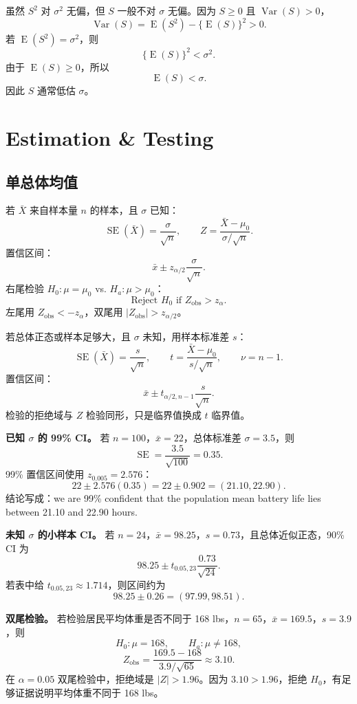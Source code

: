 \documentclass[11pt,a4paper]{article}
\newcommand{\E}{\operatorname{E}}
\newcommand{\Var}{\operatorname{Var}}
\newcommand{\SE}{\operatorname{SE}}
\begin{document}
\begin{proofbox}[为什么样本标准差不是无偏估计]
虽然 $S^2$ 对 $\sigma^2$ 无偏，但 $S$ 一般不对 $\sigma$ 无偏。因为 $S\ge 0$ 且 $\Var(S)>0$，
\[
  \Var(S)=\E(S^2)-\{\E(S)\}^2>0.
\]
若 $\E(S^2)=\sigma^2$，则
\[
  \{\E(S)\}^2<\sigma^2.
\]
由于 $\E(S)\ge 0$，所以
\[
  \E(S)<\sigma.
\]
因此 $S$ 通常低估 $\sigma$。
\end{proofbox}

\section{Estimation \& Testing}

\subsection{单总体均值}

\begin{templatebox}[已知总体标准差的均值推断]
若 $\bar X$ 来自样本量 $n$ 的样本，且 $\sigma$ 已知：
\[
  \SE(\bar X)=\frac{\sigma}{\sqrt n},
  \qquad
  Z=\frac{\bar X-\mu_0}{\sigma/\sqrt n}.
\]
置信区间：
\[
  \boxed{
  \bar x\pm z_{\alpha/2}\frac{\sigma}{\sqrt n}
  }.
\]
右尾检验 $H_0:\mu=\mu_0$ vs. $H_a:\mu>\mu_0$：
\[
  \text{Reject }H_0\text{ if }Z_{\mathrm{obs}}>z_\alpha.
\]
左尾用 $Z_{\mathrm{obs}}<-z_\alpha$，双尾用 $|Z_{\mathrm{obs}}|>z_{\alpha/2}$。
\end{templatebox}

\begin{templatebox}[未知总体标准差的均值推断]
若总体正态或样本足够大，且 $\sigma$ 未知，用样本标准差 $s$：
\[
  \SE(\bar X)=\frac{s}{\sqrt n},
  \qquad
  t=\frac{\bar X-\mu_0}{s/\sqrt n},
  \qquad
  \nu=n-1.
\]
置信区间：
\[
  \boxed{
  \bar x\pm t_{\alpha/2,n-1}\frac{s}{\sqrt n}
  }.
\]
检验的拒绝域与 $Z$ 检验同形，只是临界值换成 $t$ 临界值。
\end{templatebox}

\begin{examplebox}
\textbf{已知 $\sigma$ 的 99\% CI。}
若 $n=100$，$\bar x=22$，总体标准差 $\sigma=3.5$，则
\[
  \SE=\frac{3.5}{\sqrt{100}}=0.35.
\]
99\% 置信区间使用 $z_{0.005}=2.576$：
\[
  22\pm 2.576(0.35)
  =
  22\pm0.902
  =
  (21.10,22.90).
\]
结论写成：we are 99\% confident that the population mean battery life lies between 21.10 and 22.90 hours.

\textbf{未知 $\sigma$ 的小样本 CI。}
若 $n=24$，$\bar x=98.25$，$s=0.73$，且总体近似正态，90\% CI 为
\[
  98.25\pm t_{0.05,23}\frac{0.73}{\sqrt{24}}.
\]
若表中给 $t_{0.05,23}\approx1.714$，则区间约为
\[
  98.25\pm0.26=(97.99,98.51).
\]

\textbf{双尾检验。}
若检验居民平均体重是否不同于 168 lbs，$n=65$，$\bar x=169.5$，$s=3.9$，则
\[
  H_0:\mu=168,\qquad H_a:\mu\ne168,
\]
\[
  Z_{\mathrm{obs}}
  =
  \frac{169.5-168}{3.9/\sqrt{65}}
  \approx3.10.
\]
在 $\alpha=0.05$ 双尾检验中，拒绝域是 $|Z|>1.96$。因为 $3.10>1.96$，拒绝 $H_0$，有足够证据说明平均体重不同于 168 lbs。
\end{examplebox}
\end{document}
